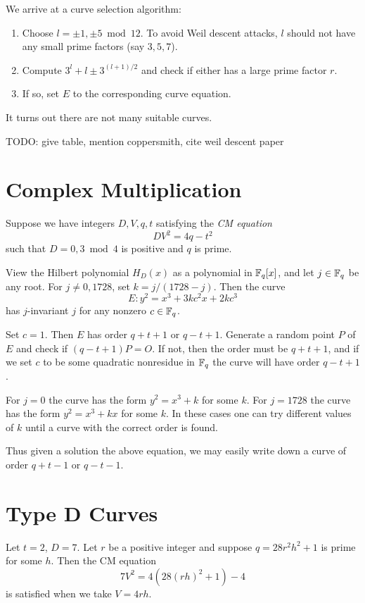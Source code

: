 We arrive at a curve selection algorithm:

\begin{enumerate}
\item
Choose $l = \pm 1, \pm 5 \bmod 12$. To avoid Weil descent attacks,
$l$ should not have any small prime factors (say $3,5,7$).
\item
Compute $3^l + l \pm 3^{(l+1)/2}$ and check if either has a large prime
factor $r$.
\item
If so, set $E$ to the corresponding curve equation.
\end{enumerate}

It turns out there are not many suitable curves.

TODO: give table, mention coppersmith, cite weil descent paper

\section { Complex Multiplication }

Suppose we have integers $D, V, q, t$ satisfying the \emph{CM equation}
\[ D V^2 = 4 q - t^2 \]
such that $D = 0, 3 \bmod 4$ is positive and $q$ is prime.

View the Hilbert polynomial $H_D(x)$ as a polynomial in $\mathbb{F}_q[x]$,
and let $j \in \mathbb{F}_q$ be any root. For $j \ne 0, 1728$, set
$k = j / (1728 - j)$. Then the curve
\[ E: y^2 = x^3 + 3 k c^2 x + 2 k c^3 \]
has $j$-invariant $j$ for any nonzero $c \in \mathbb{F}_q$.

Set $c = 1$. Then $E$ has order $q + t + 1$ or $q - t + 1$.
Generate a random point $P$ of $E$ and check if
$(q-t+1)P = O$. If not, then the order must be $q + t + 1$,
and if we set $c$ to be some quadratic nonresidue in $\mathbb{F}_q$ the
curve will have order $q - t + 1$.

For $j = 0$ the curve has the form $y^2 = x^3 + k$ for some $k$.
For $j = 1728$ the curve has the form $y^2 = x^3 + k x$ for some $k$.
In these cases one can try different values of $k$ until a curve
with the correct order is found.

Thus given a solution the above equation, we may easily write down
a curve of order $q+t-1$ or $q-t-1$.

\section { Type D Curves }

Let $t = 2$, $D = 7$. Let $r$ be a positive integer
and suppose $q = 28 r^2 h^2 + 1$ is prime for some $h$.
Then the CM equation
\[
7 V^2 = 4 (28 (r h)^2 + 1) - 4
\]
is satisfied when we take $V = 4 r h$.

